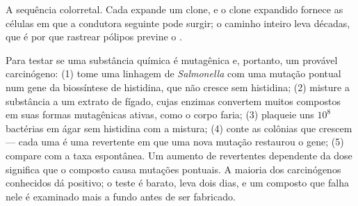 \begin{omfigure}

{\small A sequência colorretal. Cada  expande um clone,
e o clone expandido fornece as células em que a condutora seguinte pode
surgir; o caminho inteiro leva décadas, que é por que rastrear pólipos
previne o .}
\end{omfigure}

\begin{method}\label{met:b3:cancer-biology:ames}
Para testar se uma substância química é mutagênica e, portanto, um
provável carcinógeno: (1) tome uma linhagem de \emph{Salmonella} com
uma mutação pontual num gene da biossíntese de histidina, que não
cresce sem histidina; (2) misture a substância a um extrato de fígado,
cujas enzimas convertem muitos compostos em suas formas mutagênicas
ativas, como o corpo faria; (3) plaqueie uns $10^{8}$ bactérias em ágar
sem histidina com a mistura; (4) conte as colônias que crescem --- cada
uma é uma revertente em que uma nova mutação restaurou o gene; (5)
compare com a taxa espontânea. Um aumento de revertentes dependente da
dose significa que o composto causa mutações pontuais. A maioria dos
carcinógenos conhecidos dá positivo; o teste é barato, leva dois dias,
e um composto que falha nele é examinado mais a fundo antes de ser
fabricado.
\end{method}

